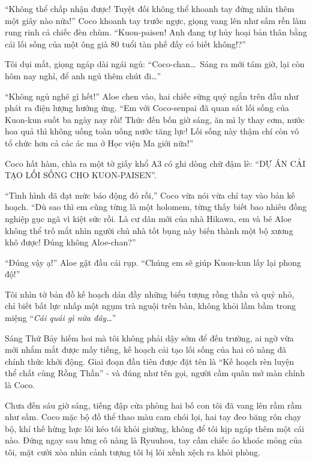 \documentclass[../main.tex]{subfiles}
\begin{document}
``Không thể chấp nhận được! Tuyệt đối không thể khoanh tay đứng nhìn thêm một giây nào nữa!'' Coco khoanh tay trước ngực, giọng vang lên như sấm rền làm rung rinh cả chiếc đèn chùm. ``Kuon-paisen! Anh đang tự hủy hoại bản thân bằng cái lối sống của một ông già 80 tuổi tàn phế đấy có biết không!?''

Tôi dụi mắt, giọng ngáp dài ngái ngủ: ``Coco-chan\dots\ Sáng ra mới tám giờ, lại còn hôm nay nghỉ, để anh ngủ thêm chút đi\dots''

``Không ngủ nghê gì hết!'' Aloe chen vào, hai chiếc sừng quỷ ngắn trên đầu như phát ra điện lượng hưởng ứng. ``Em với Coco-senpai đã quan sát lối sống của Kuon-kun suốt ba ngày nay rồi! Thức đến bốn giờ sáng, ăn mì ly thay cơm, nước hoa quả thì không uống toàn uống nước tăng lực! Lối sống này thậm chí còn vô tổ chức hơn cả các ác ma ở Học viện Ma giới nữa!''

Coco hất hàm, chìa ra một tờ giấy khổ A3 có ghi dòng chữ đậm lè: ``DỰ ÁN CẢI TẠO LỐI SỐNG CHO KUON-PAISEN''.

``Tình hình đã đạt mức báo động đỏ rồi,'' Coco vừa nói vừa chỉ tay vào bản kế hoạch. ``Dù sao thì em cũng từng là một holomem, từng thấy biết bao nhiêu đồng nghiệp gục ngã vì kiệt sức rồi. Là cư dân mới của nhà Hikawa, em và bé Aloe không thể trố mắt nhìn người chủ nhà tốt bụng này biến thành một bộ xương khô được! Đúng không Aloe-chan?''

``Đúng vậy ạ!'' Aloe gật đầu cái rụp. ``Chúng em sẽ giúp Kuon-kun lấy lại phong độ!''

Tôi nhìn tờ bản đồ kế hoạch dán đầy những biểu tượng rồng thần và quỷ nhỏ, chỉ biết bất lực nhấp một ngụm trà nguội trên bàn, không khỏi lầm bầm trong miệng ``\textit{Cái quái gì nữa đây\dots}''

\ct

Sáng Thứ Bảy hiếm hoi mà tôi không phải dậy sớm để đến trường, ai ngờ vừa mới nhắm mắt được mấy tiếng, kế hoạch cải tạo lối sống của hai cô nàng đã chính thức khởi động. Giai đoạn đầu tiên được đặt tên là ``Kế hoạch rèn luyện thể chất cùng Rồng Thần'' - và đúng như tên gọi, người cầm quân mở màn chính là Coco.

Chưa đến sáu giờ sáng, tiếng đập cửa phòng hai bố con tôi đã vang lên rầm rầm như sấm. Coco mặc bộ đồ thể thao màu cam chói lọi, hai tay đeo băng rôn chạy bộ, khí thế hừng hực lôi kéo tôi khỏi giường, không để tôi kịp ngáp thêm một cái nào. Đứng ngay sau lưng cô nàng là Ryuuhou, tay cầm chiếc áo khoác mỏng của tôi, mặt cười xòa nhìn cảnh tượng tôi bị lôi xềnh xệch ra khỏi phòng.
\end{document}

